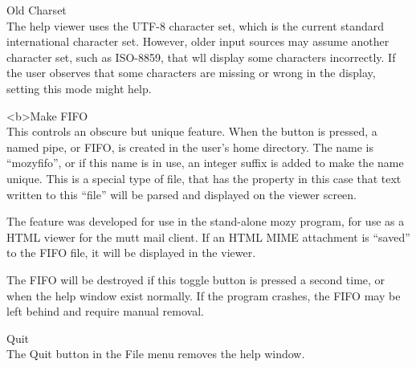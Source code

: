 \begin{description}
\item{\cb Old Charset}\\
The help viewer uses the UTF-8 character set, which is the current
standard international character set.  However, older input sources
may assume another character set, such as ISO-8859, that wll display
some characters incorrectly.  If the user observes that some
characters are missing or wrong in the display, setting this mode
might help.

\item{\cb <b>Make FIFO}\\
This controls an obscure but unique feature.  When the button is
pressed, a named pipe, or FIFO, is created in the user's home
directory.  The name is ``{\vt mozyfifo}'', or if this name is in use,
an integer suffix is added to make the name unique.  This is a special
type of file, that has the property in this case that text written to
this ``file'' will be parsed and displayed on the viewer screen.

The feature was developed for use in the stand-alone {\vt mozy}
program, for use as a HTML viewer for the {\vt mutt} mail client.  If
an HTML MIME attachment is ``saved'' to the FIFO file, it will be
displayed in the viewer.

The FIFO will be destroyed if this toggle button is pressed a second
time, or when the help window exist normally.  If the program crashes,
the FIFO may be left behind and require manual removal.

\item{\cb Quit}\\
The {\cb Quit} button in the {\cb File} menu removes the help window.
\end{description}

